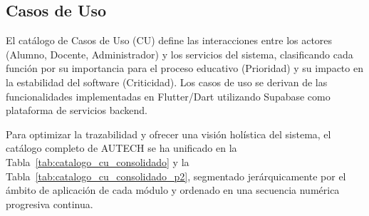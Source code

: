 \subsection{Casos de Uso}
\label{subsec:casos_uso}

El catálogo de Casos de Uso (CU) define las interacciones entre los actores (Alumno, Docente, Administrador) y los servicios del sistema, clasificando cada función por su importancia para el proceso educativo (Prioridad) y su impacto en la estabilidad del software (Criticidad). Los casos de uso se derivan de las funcionalidades implementadas en Flutter/Dart utilizando Supabase como plataforma de servicios backend.

Para optimizar la trazabilidad y ofrecer una visión holística del sistema, el catálogo completo de AUTECH se ha unificado en la Tabla~\ref{tab:catalogo_cu_consolidado} y la Tabla~\ref{tab:catalogo_cu_consolidado_p2}, segmentado jerárquicamente por el ámbito de aplicación de cada módulo y ordenado en una secuencia numérica progresiva continua.

